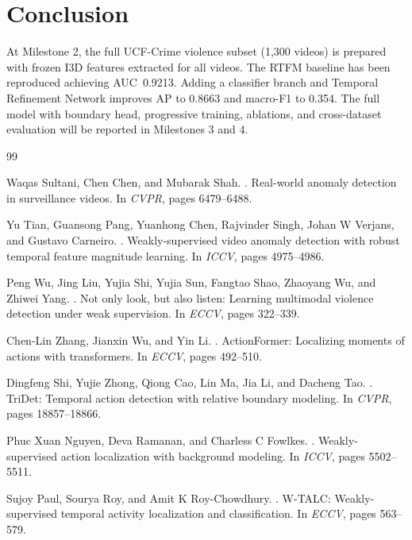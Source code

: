 \documentclass[11pt]{article}
\begin{document}
\section{Conclusion}
At Milestone 2, the full UCF-Crime violence subset (1,300 videos) is prepared with frozen I3D features extracted for all videos. The RTFM baseline has been reproduced achieving AUC~0.9213. Adding a classifier branch and Temporal Refinement Network improves AP to 0.8663 and macro-F1 to 0.354. The full model with boundary head, progressive training, ablations, and cross-dataset evaluation will be reported in Milestones 3 and 4.


\begin{thebibliography}{99}

Waqas Sultani, Chen Chen, and Mubarak Shah.
.
\newblock Real-world anomaly detection in surveillance videos.
\newblock In \textit{CVPR}, pages 6479--6488.

Yu Tian, Guansong Pang, Yuanhong Chen, Rajvinder Singh, Johan W Verjans, and Gustavo Carneiro.
.
\newblock Weakly-supervised video anomaly detection with robust temporal feature magnitude learning.
\newblock In \textit{ICCV}, pages 4975--4986.

Peng Wu, Jing Liu, Yujia Shi, Yujia Sun, Fangtao Shao, Zhaoyang Wu, and Zhiwei Yang.
.
\newblock Not only look, but also listen: Learning multimodal violence detection under weak supervision.
\newblock In \textit{ECCV}, pages 322--339.

Chen-Lin Zhang, Jianxin Wu, and Yin Li.
.
\newblock ActionFormer: Localizing moments of actions with transformers.
\newblock In \textit{ECCV}, pages 492--510.

Dingfeng Shi, Yujie Zhong, Qiong Cao, Lin Ma, Jia Li, and Dacheng Tao.
.
\newblock TriDet: Temporal action detection with relative boundary modeling.
\newblock In \textit{CVPR}, pages 18857--18866.

Phuc Xuan Nguyen, Deva Ramanan, and Charless C Fowlkes.
.
\newblock Weakly-supervised action localization with background modeling.
\newblock In \textit{ICCV}, pages 5502--5511.

Sujoy Paul, Sourya Roy, and Amit K Roy-Chowdhury.
.
\newblock W-TALC: Weakly-supervised temporal activity localization and classification.
\newblock In \textit{ECCV}, pages 563--579.


\end{thebibliography}
\end{document}
